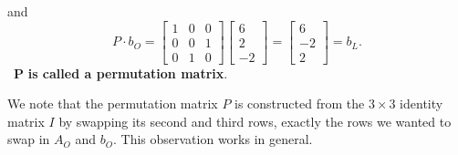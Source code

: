  and 
$$P \cdot b_O=\left[\begin{array}{rrr} 1 & 0 & 0\\
0 & 0 & 1 \\ 0 & 1 & 0 \end{array}\right]\left[\begin{array}{r} 6 \\2 \\-2\end{array} \right] = \left[\begin{array}{r} 6 \\-2 \\2\end{array} \right] = b_L. $$\
$\mathbf{P}$ \textbf{is called a permutation matrix}. \\

\begin{tcolorbox}[title=\textbf{Key Insight on Swapping Rows}] We note that the permutation matrix $P$ is constructed from the $3 \times 3$ identity matrix $I$ by swapping its second and third rows, exactly the rows we wanted to swap in $A_O$ and $b_O$. This observation works in general. 
\end{tcolorbox}

